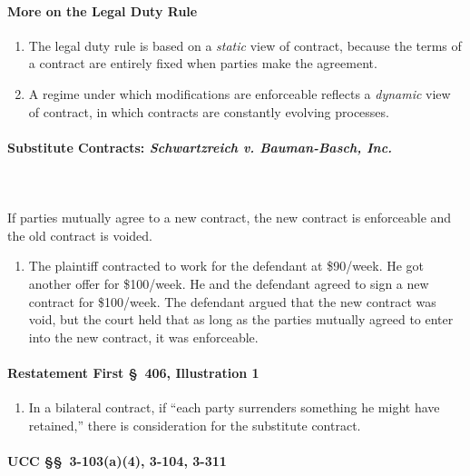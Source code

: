 \paragraph{More on the Legal Duty Rule}

\begin{enumerate}
    \item The legal duty rule is based on a \emph{static} view of contract, 
    because the terms of a contract are entirely fixed when parties make the 
    agreement.
    \item A regime under which modifications are enforceable reflects a 
    \emph{dynamic} view of contract, in which contracts are constantly 
    evolving processes.
\end{enumerate}

\paragraph{Substitute Contracts: \emph{Schwartzreich v. Bauman-Basch, Inc.}}
~\\\\
If parties mutually agree to a new contract, the new contract is enforceable 
and the old contract is voided.

\begin{enumerate}
    \item The plaintiff contracted to work for the defendant at \$90/week. He 
    got another offer for \$100/week. He and the defendant agreed to sign a 
    new contract for \$100/week. The defendant argued that the new contract 
    was void, but the court held that as long as the parties mutually agreed 
    to enter into the new contract, it was enforceable.
\end{enumerate}

\paragraph{Restatement First \S\ 406, Illustration 1}

\begin{enumerate}
    \item In a bilateral contract, if ``each party surrenders something he 
    might have retained,'' there is consideration for the substitute contract.
\end{enumerate}

\paragraph{UCC \S\S\ 3-103(a)(4), 3-104, 3-311}

